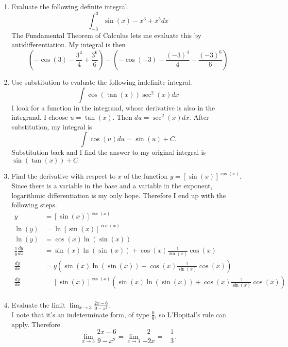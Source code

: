 \documentclass{exam}
\begin{document}
\begin{enumerate}
\item Evaluate the following definite integral.
$$\int_{-3}^3 \sin(x) - x^3 + x^5 dx$$
The Fundamental Theorem of Calculus lets me evaluate this by antidifferentiation. My integral is then
$$\left (-\cos(3) - \frac{3^4}{4} + \frac{3^6}6\right) - \left (-\cos(-3) - \frac{(-3)^4}{4} + \frac{(-3)^6}6\right)$$
\item Use substitution to evaluate the following indefinite integral.
$$\int \cos(\tan(x))\sec^2(x) dx$$
I look for a function in the integrand, whose derivative is also in the integrand. I choose $u = \tan(x)$. Then $du = \sec^2(x)dx$. After substitution, my integral is $$\int \cos(u) du = \sin(u) + C.$$ Substitution back and I find the answer to my original integral is $\sin(\tan(x)) + C$
\item Find the derivative with respect to $x$ of the function $y =[\sin(x)]^{\cos(x)}$.\\
Since there is a variable in the base and a variable in the exponent, logarithmic differentiation is my only hope. Therefore I end up with the following steps.
\begin{align*}
    y &= [\sin(x)]^{\cos(x)}\\
    \ln(y) &= \ln [\sin(x)]^{\cos(x)}\\
    \ln(y) &= \cos(x) \ln(\sin(x))\\
    \frac{1}{y} \frac{dy}{dx} &= \sin(x) \ln(\sin(x)) + \cos(x) \frac{1}{\sin(x)} \cos(x)\\
    \frac{dy}{dx} &= y\left(\sin(x) \ln(\sin(x)) + \cos(x) \frac{1}{\sin(x)} \cos(x)\right)\\
    \frac{dy}{dx} &= [\sin(x)]^{\cos(x)}\left(\sin(x) \ln(\sin(x)) + \cos(x) \frac{1}{\sin(x)} \cos(x)\right)\\
\end{align*}
\item Evaluate the limit $\lim_{x\rightarrow 3} \frac{2x-6}{9 - x^2}$.\\
I note that it's an indeterminate form, of type $\frac{0}{0}$, so L'Hopital's rule can apply. Therefore 
$$\lim_{x\rightarrow 3} \frac{2x-6}{9 - x^2} = \lim_{x \rightarrow 3} \frac{2}{-2x} = -\frac{1}{3}.$$
\end{enumerate}
\end{document}
